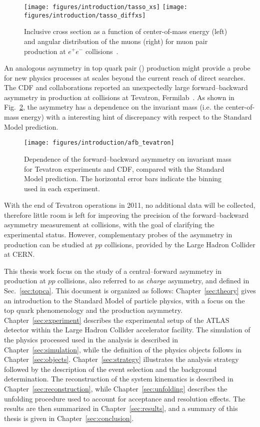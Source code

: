 \begin{figure}[!htb]\centering
  \texttt{[image: figures/introduction/tasso\_xs]}
  \texttt{[image: figures/introduction/tasso\_diffxs]}
  \caption{Inclusive cross section as a function of center-of-mass
    energy (left) and angular distribution of the muons (right) for
    muon pair production at $e^+e^-$ collisions~\cite{Braunschweig:1988fy}.}
  \label{fig:tasso}
\end{figure}

An analogous asymmetry in top quark pair (\ttbar{}) production might provide a
probe for new physics processes at scales beyond the current reach of direct
searches. The CDF and \dzero{} collaborations reported an unexpectedly
large forward--backward asymmetry in \ttbar{} production at \ppbar{}
collisions at Tevatron, Fermilab~\cite{Abazov:2014cca,}. As shown in
Fig.~\ref{fig:afbtev}, the asymmetry has a dependence on the \ttbar{}
invariant mass (i.e. the center-of-mass energy) with a interesting
hint of discrepancy with respect to the Standard Model prediction.
\begin{figure}[!htb]\centering
  \texttt{[image: figures/introduction/afb\_tevatron]}
  \caption{Dependence of the forward--backward asymmetry on \ttbar{}
    invariant mass for Tevatron experiments \dzero{} and CDF, compared
    with the Standard Model prediction. The horizontal error bars
    indicate the binning used in each experiment.~\cite{Aguilar-Saavedra:2014kpa}}
  \label{fig:afbtev}
\end{figure}
With the end of Tevatron operations in 2011, no additional data will
be collected, therefore little room is left for improving the
precision of the forward--backward asymmetry measurement at \ppbar{}
collisions, with the goal of clarifying the experimental status.
However, complementary probes of the asymmetry in \ttbar{} production
can be studied at $pp$ collisions, provided by the Large Hadron
Collider at CERN.

This thesis work focus on the study of a central--forward asymmetry in
\ttbar{} production at $pp$ collisions, also referred to as {\it
  charge} asymmetry, and defined in Sec.~\ref{sec:topca}. This
document is organized as follows: Chapter~\ref{sec:theory} gives an
introduction to the Standard Model of particle physics, with a focus
on the top quark phenomenology and the production
asymmetry. Chapter~\ref{sec:experiment} describes the experimental
setup of the ATLAS detector within the Large Hadron Collider
accelerator facility. The simulation of the physics processed used in
the analysis is described in Chapter~\ref{sec:simulation}, while the
definition of the physics objects follows in
Chapter~\ref{sec:objects}. Chapter~\ref{sec:strategy} illustrates the
analysis strategy followed by the description of the event selection
and the background determination. The reconstruction of the \ttbar
system kinematics is described in Chapter~\ref{sec:reconstruction},
while Chapter~\ref{sec:unfolding} describes the unfolding procedure
used to account for acceptance and resolution effects.
The results are then summarized in Chapter~\ref{sec:results}, and a
summary of this thesis is given in Chapter~\ref{sec:conclusion}.